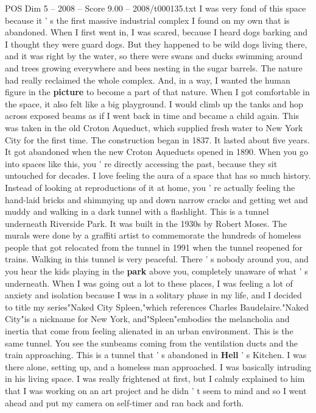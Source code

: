 \begin{textsample}{POS Dim 5 – 2008 – Score 9.00 – 2008/t000135.txt}
I was very fond of this space because it ' s the first massive industrial complex I found on my own that is abandoned.
When I first went in, I was scared, because I heard dogs barking and I thought they were guard dogs.
But they happened to be wild dogs living there, and it was right by the water, so there were swans and ducks swimming around and trees growing everywhere and bees nesting in the sugar barrels.
The nature had really reclaimed the whole complex.
And, in a way, I wanted the human figure in the \textbf{picture} to become a part of that nature.
When I got comfortable in the space, it also felt like a big playground.
I would climb up the tanks and hop across exposed beams as if I went back in time and became a child again.
This was taken in the old Croton Aqueduct, which supplied fresh water to New York City for the first time.
The construction began in 1837.
It lasted about five years.
It got abandoned when the new Croton Aqueducts opened in 1890.
When you go into spaces like this, you ' re directly accessing the past, because they sit untouched for decades.
I love feeling the aura of a space that has so much history.
Instead of looking at reproductions of it at home, you ' re actually feeling the hand-laid bricks and shimmying up and down narrow cracks and getting wet and muddy and walking in a dark tunnel with a flashlight.
This is a tunnel underneath Riverside Park.
It was built in the 1930s by Robert Moses.
The murals were done by a graffiti artist to commemorate the hundreds of homeless people that got relocated from the tunnel in 1991 when the tunnel reopened for trains.
Walking in this tunnel is very peaceful.
There ' s nobody around you, and you hear the kids playing in the \textbf{park} above you, completely unaware of what ' s underneath.
When I was going out a lot to these places, I was feeling a lot of anxiety and isolation because I was in a solitary phase in my life, and I decided to title my series"Naked City Spleen,"which references Charles Baudelaire."Naked City"is a nickname for New York, and"Spleen"embodies the melancholia and inertia that come from feeling alienated in an urban environment.
This is the same tunnel.
You see the sunbeams coming from the ventilation ducts and the train approaching.
This is a tunnel that ' s abandoned in \textbf{Hell} ' s Kitchen.
I was there alone, setting up, and a homeless man approached.
I was basically intruding in his living space.
I was really frightened at first, but I calmly explained to him that I was working on an art project and he didn ' t seem to mind and so I went ahead and put my camera on self-timer and ran back and forth.

\end{textsample}
